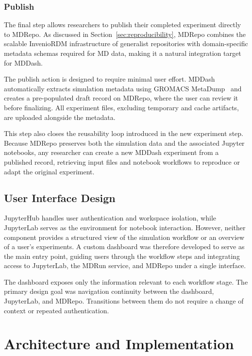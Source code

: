 \documentclass[
  digital,     %
  color,       %
  oneside,     %
  nosansbold,  %
  nocolorbold, %
  lof,         %
  lot,         %
]{fithesis4}
\begin{document}
\subsection{Publish}
\label{sec:step_publish}

The final step allows researchers to publish their completed experiment directly to MDRepo. As discussed in Section~\ref{sec:reproducibility}, MDRepo combines the scalable InvenioRDM infrastructure of generalist repositories with domain-specific metadata schemas required for MD data, making it a natural integration target for MDDash.

The publish action is designed to require minimal user effort. MDDash automatically extracts simulation metadata using GROMACS MetaDump~\cite{gromacs_metadump} and creates a pre-populated draft record on MDRepo, where the user can review it before finalizing. All experiment files, excluding temporary and cache artifacts, are uploaded alongside the metadata.

This step also closes the reusability loop introduced in the new experiment step. Because MDRepo preserves both the simulation data and the associated Jupyter notebooks, any researcher can create a new MDDash experiment from a published record, retrieving input files and notebook workflows to reproduce or adapt the original experiment.

\section{User Interface Design}

JupyterHub handles user authentication and workspace isolation, while JupyterLab serves as the environment for notebook interaction. However, neither component provides a structured view of the simulation workflow or an overview of a user's experiments. A custom dashboard was therefore developed to serve as the main entry point, guiding users through the workflow steps and integrating access to JupyterLab, the MDRun service, and MDRepo under a single interface.

The dashboard exposes only the information relevant to each workflow stage. The primary design goal was navigation continuity between the dashboard, JupyterLab, and MDRepo. Transitions between them do not require a change of context or repeated authentication.


\chapter{Architecture and Implementation}
\end{document}
